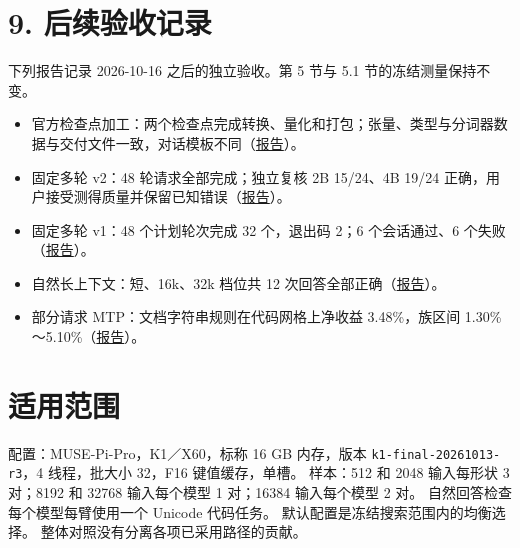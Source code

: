 \documentclass[10pt,a4paper,fontset=none]{ctexart}
\providecommand{\tightlist}{\setlength{\itemsep}{0pt}\setlength{\parskip}{0pt}}
\begin{document}
\hypertarget{ux540eux7eedux9a8cux6536ux8bb0ux5f55}{%
\section{9. 后续验收记录}\label{ux540eux7eedux9a8cux6536ux8bb0ux5f55}}

下列报告记录 2026-10-16 之后的独立验收。第 5 节与 5.1
节的冻结测量保持不变。

\begin{itemize}
\tightlist
\item
  官方检查点加工：两个检查点完成转换、量化和打包；张量、类型与分词器数据与交付文件一致，对话模板不同（\href{https://github.com/MoyaMryia/riscv-accl/blob/main/spacemit/reports/2026-10-21-official-conversion.md}{报告}）。
\item
  固定多轮 v2：48 轮请求全部完成；独立复核 2B 15/24、4B 19/24
  正确，用户接受测得质量并保留已知错误（\href{https://github.com/MoyaMryia/riscv-accl/blob/main/spacemit/reports/2026-10-21-fixed-multi-turn-v2-results.md}{报告}）。
\item
  固定多轮 v1：48 个计划轮次完成 32 个，退出码 2；6 个会话通过、6
  个失败（\href{https://github.com/MoyaMryia/riscv-accl/blob/main/spacemit/reports/2026-10-21-fixed-multi-turn-results.md}{报告}）。
\item
  自然长上下文：短、16k、32k 档位共 12
  次回答全部正确（\href{https://github.com/MoyaMryia/riscv-accl/blob/main/spacemit/reports/2026-10-22-long-context-natural-results.md}{报告}）。
\item
  部分请求 MTP：文档字符串规则在代码网格上净收益 3.48\%，族区间
  1.30\%～5.10\%（\href{https://github.com/MoyaMryia/riscv-accl/blob/main/spacemit/reports/2026-10-21-2b-mtp-docstring-rule-validation.md}{报告}）。
\end{itemize}

\hypertarget{ux9002ux7528ux8303ux56f4}{%
\section{适用范围}\label{ux9002ux7528ux8303ux56f4}}

配置：MUSE-Pi-Pro，K1／X60，标称 16 GB 内存，版本
\nolinkurl{k1-final-20261013-r3}，4 线程，批大小 32，F16
键值缓存，单槽。 样本：512 和 2048 输入每形状 3 对；8192 和 32768
输入每个模型 1 对；16384 输入每个模型 2 对。
自然回答检查每个模型每臂使用一个 Unicode 代码任务。
默认配置是冻结搜索范围内的均衡选择。
整体对照没有分离各项已采用路径的贡献。
\end{document}
